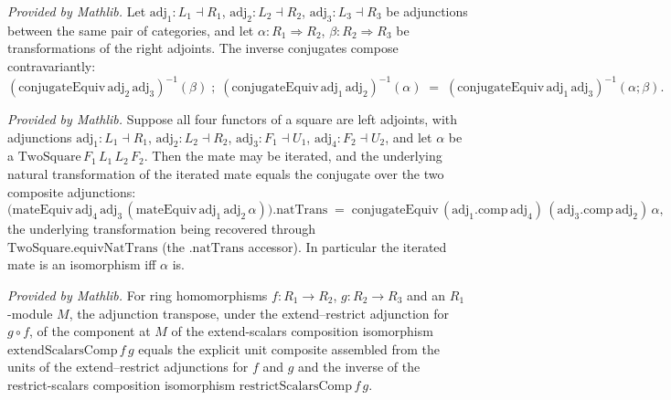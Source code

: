 \begin{lemma}
  \label{lem:conjugateEquiv_symm_comp_mathlib}
  \mathlibok
  \textit{Provided by Mathlib.}
  Let \(\mathrm{adj}_1 : L_1 \dashv R_1\), \(\mathrm{adj}_2 : L_2 \dashv R_2\),
  \(\mathrm{adj}_3 : L_3 \dashv R_3\) be adjunctions between the same pair of categories, and
  let \(\alpha : R_1 \Rightarrow R_2\), \(\beta : R_2 \Rightarrow R_3\) be transformations of
  the right adjoints. The inverse conjugates compose contravariantly:
  \[
    (\mathrm{conjugateEquiv}\,\mathrm{adj}_2\,\mathrm{adj}_3)^{-1}(\beta)
      \;\mathbin{;}\;
    (\mathrm{conjugateEquiv}\,\mathrm{adj}_1\,\mathrm{adj}_2)^{-1}(\alpha)
      \;=\;
    (\mathrm{conjugateEquiv}\,\mathrm{adj}_1\,\mathrm{adj}_3)^{-1}(\alpha \mathbin{;} \beta).
  \]
\end{lemma}

\begin{lemma}
  \label{lem:iterated_mateEquiv_conjugateEquiv_mathlib}
  \mathlibok
  \textit{Provided by Mathlib.}
  Suppose all four functors of a square are left adjoints, with adjunctions
  \(\mathrm{adj}_1 : L_1 \dashv R_1\), \(\mathrm{adj}_2 : L_2 \dashv R_2\),
  \(\mathrm{adj}_3 : F_1 \dashv U_1\), \(\mathrm{adj}_4 : F_2 \dashv U_2\), and let \(\alpha\)
  be a \(\mathrm{TwoSquare}\,F_1\,L_1\,L_2\,F_2\). Then the mate may be iterated, and the
  underlying natural transformation of the iterated mate equals the conjugate over the two
  composite adjunctions:
  \[
    \bigl(\mathrm{mateEquiv}\,\mathrm{adj}_4\,\mathrm{adj}_3\,
      (\mathrm{mateEquiv}\,\mathrm{adj}_1\,\mathrm{adj}_2\,\alpha)\bigr).\mathrm{natTrans}
      \;=\;
    \mathrm{conjugateEquiv}\,(\mathrm{adj}_1.\mathrm{comp}\,\mathrm{adj}_4)\,
      (\mathrm{adj}_3.\mathrm{comp}\,\mathrm{adj}_2)\,\alpha,
  \]
  the underlying transformation being recovered through \(\mathrm{TwoSquare.equivNatTrans}\)
  (the \(\mathrm{.natTrans}\) accessor). In particular the iterated mate is an isomorphism iff
  \(\alpha\) is.
\end{lemma}

\begin{lemma}
  \label{lem:homEquiv_extendScalarsComp_mathlib}
  \mathlibok
  \textit{Provided by Mathlib.}
  For ring homomorphisms \(f : R_1 \to R_2\), \(g : R_2 \to R_3\) and an
  \(R_1\)-module \(M\), the adjunction transpose, under the extend--restrict
  adjunction for \(g \circ f\), of the component at \(M\) of the extend-scalars
  composition isomorphism \(\mathrm{extendScalarsComp}\,f\,g\) equals the explicit
  unit composite assembled from the units of the extend--restrict adjunctions for
  \(f\) and \(g\) and the inverse of the restrict-scalars composition isomorphism
  \(\mathrm{restrictScalarsComp}\,f\,g\).
\end{lemma}


